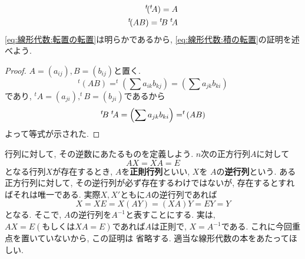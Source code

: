 \documentclass[a4j,dvipdfmx]{jsarticle}
\numberwithin{equation}{section}
\begin{document}
            \begin{align}
                ^t\!(^t\!A)=A \label{eq:線形代数:転置の転置} \\
                ^t\!(AB) = {}^t\!B \hspace{1mm}{}^t\!A \label{eq:線形代数:積の転置}
            \end{align}
            \eqref{eq:線形代数:転置の転置}は明らかであるから, \eqref{eq:線形代数:積の転置}の証明を述べよう.
            \begin{proof}
                $A=(a_{ij}),B=(b_{ij})$と置く.
                \begin{equation*}
                    ^t\!(AB)=^t\!\left(\sum a_{ik}b_{kj}\right)=\left(\sum a_{jk}b_{ki}\right)
                \end{equation*}
                であり, $^t\!A=(a_{ji}),^t\!B=(b_{ji})$であるから
                \begin{equation*}
                    ^t\!B\hspace{1mm} ^t\! A = \left(\sum a_{jk}b_{ki}\right) = ^t\!(AB)
                \end{equation*}
                よって等式が示された.
            \end{proof}
            \clearpage
            行列に対して, その逆数にあたるものを定義しよう. $n$次の正方行列$A$に対して
            \begin{equation}
                AX=XA=E \label{eq:線形代数:逆行列の定義}
            \end{equation}
            となる行列$X$が存在するとき, $A$を\textbf{正則行列}といい, $X$を
            $A$の\textbf{逆行列}という. ある正方行列に対して, その逆行列が必ず存在するわけではないが, 
            存在するとすればそれは唯一である. 実際$X,X'$ともに$A$の逆行列であれば
            \begin{equation*}
                X=XE=X(AY)=(XA)Y=EY=Y
            \end{equation*} 
            となる. そこで, $A$の逆行列を$A^{-1}$と表すことにする. 実は, $AX=E(\text{もしくは}XA=E)$であれば$A$は正則で, $X=A^{-1}$である. これに今回重点を置いていないから, この証明は
            省略する. 適当な線形代数の本をあたってほしい.
\end{document}
